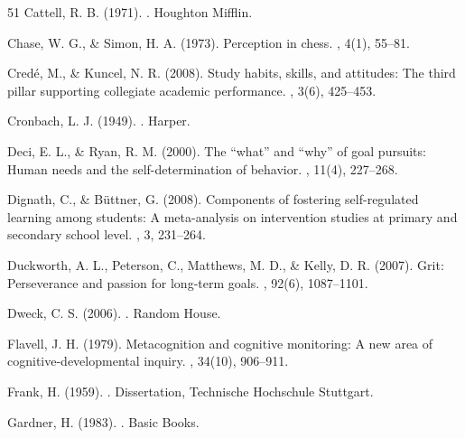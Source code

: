 \documentclass[12pt,a4paper]{article}
\begin{document}
\begin{thebibliography}{51}
Cattell, R. B. (1971).
.
\newblock Houghton Mifflin.

Chase, W. G., \& Simon, H. A. (1973).
\newblock Perception in chess.
, 4(1), 55--81.

Credé, M., \& Kuncel, N. R. (2008).
\newblock Study habits, skills, and attitudes: The third pillar supporting collegiate academic performance.
, 3(6), 425--453.

Cronbach, L. J. (1949).
.
\newblock Harper.

Deci, E. L., \& Ryan, R. M. (2000).
\newblock The ``what'' and ``why'' of goal pursuits: Human needs and the self-determination of behavior.
, 11(4), 227--268.

Dignath, C., \& B\"uttner, G. (2008).
\newblock Components of fostering self-regulated learning among students: A meta-analysis on intervention studies at primary and secondary school level.
, 3, 231--264.

Duckworth, A. L., Peterson, C., Matthews, M. D., \& Kelly, D. R. (2007).
\newblock Grit: Perseverance and passion for long-term goals.
, 92(6), 1087--1101.

Dweck, C. S. (2006).
.
\newblock Random House.

Flavell, J. H. (1979).
\newblock Metacognition and cognitive monitoring: A new area of cognitive-developmental inquiry.
, 34(10), 906--911.

Frank, H. (1959).
.
\newblock Dissertation, Technische Hochschule Stuttgart.

Gardner, H. (1983).
.
\newblock Basic Books.


\end{thebibliography}
\end{document}
